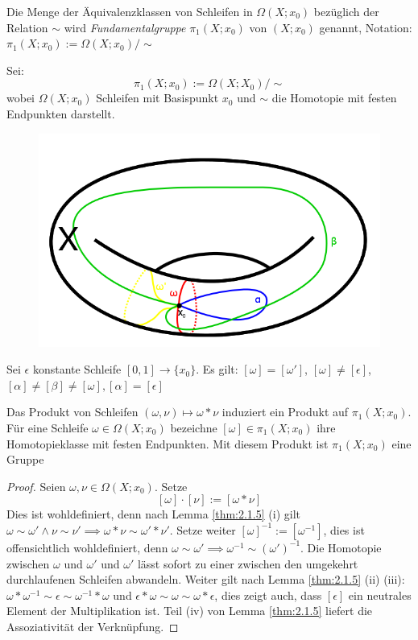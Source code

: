 \documentclass[a4paper,10pt]{scrartcl}
\begin{document}
\begin{df}
 Die Menge der Äquivalenzklassen von Schleifen in $\Omega(X;x_0)$ bezüglich der Relation $\sim$ wird \emph{Fundamentalgruppe} $\pi_1(X; x_0)$ von $(X;x_0)$ genannt, Notation: $\pi_1(X;x_0):= \Omega(X;x_0)/\sim$
\end{df}
Sei:
\[
 \pi_1(X;x_0):= \Omega(X;X_0)/\sim 
\]
wobei $\Omega(X;x_0)$ Schleifen mit Basispunkt $x_0$ und $\sim$ die Homotopie mit festen Endpunkten darstellt.\\
\setcounter{figure}{55} %
\begin{figure}[H]
\centering
\includegraphics[scale=0.3]{fig56.png}
\caption{}
\end{figure}
Sei $\epsilon$ konstante Schleife $[0,1]\to \{x_0\}$.
Es gilt: $[\omega]=[\omega']$, $[\omega]\neq [\epsilon]$, $[\alpha]\neq [\beta]\neq [\omega], [\alpha]=[\epsilon]$
\begin{st}
 Das Produkt von Schleifen $(\omega, \nu) \mapsto \omega * \nu$ induziert ein Produkt auf $\pi_1(X;x_0)$. Für 
eine Schleife $\omega \in \Omega(X;x_0)$ bezeichne $[\omega] \in \pi_1(X; x_0)$ ihre Homotopieklasse mit festen Endpunkten. Mit diesem Produkt ist $\pi_1(X;x_0)$ eine Gruppe
\end{st}
\begin{proof}
 Seien $\omega, \nu \in \Omega(X; x_0)$. Setze 
\[
 [\omega] \cdot [\nu]:=[\omega*\nu]
\]
Dies ist wohldefiniert, denn nach Lemma \ref{thm:2.1.5} (i) gilt $\omega \sim \omega' \land \nu \sim \nu' \implies \omega * \nu \sim \omega' * \nu'$. Setze weiter $[\omega]^{-1}:=[\omega^{-1}]$, dies ist offensichtlich wohldefiniert, denn $\omega \sim \omega' \implies \omega^{-1}\sim (\omega')^{-1}$. Die Homotopie zwischen $\omega$ und $\omega'$ und $\omega'$ lässt sofort zu einer zwischen den umgekehrt durchlaufenen Schleifen abwandeln. Weiter gilt nach Lemma \ref{thm:2.1.5} (ii) (iii): $\omega*\omega^{-1}\sim \epsilon \sim \omega^{-1}*\omega$ und $\epsilon*\omega\sim \omega \sim \omega*\epsilon$, dies zeigt auch, dass $[\epsilon]$ ein neutrales Element der Multiplikation ist. Teil (iv) von Lemma \ref{thm:2.1.5} liefert die Assoziativität der Verknüpfung. 
\end{proof}
\end{document}
